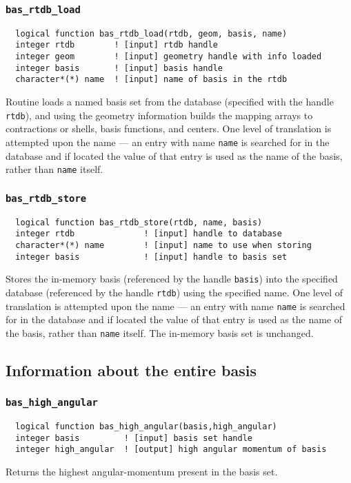 \subsubsection{{\tt bas\_rtdb\_load}}
\begin{verbatim}
  logical function bas_rtdb_load(rtdb, geom, basis, name)
  integer rtdb        ! [input] rtdb handle      
  integer geom        ! [input] geometry handle with info loaded
  integer basis       ! [input] basis handle
  character*(*) name  ! [input] name of basis in the rtdb
\end{verbatim}
Routine loads a named basis set from the database (specified with the
handle {\tt rtdb}), and using the geometry information builds the
mapping arrays to contractions or shells, basis functions, and
centers.  One level of translation is attempted upon the name --- an
entry with name {\tt name} is searched for in the database and if
located the value of that entry is used as the name of the basis,
rather than {\tt name} itself.

\subsubsection{{\tt bas\_rtdb\_store}}
\begin{verbatim}
  logical function bas_rtdb_store(rtdb, name, basis)
  integer rtdb              ! [input] handle to database
  character*(*) name        ! [input] name to use when storing
  integer basis             ! [input] handle to basis set
\end{verbatim}
Stores the in-memory basis (referenced by the handle {\tt basis}) into
the specified database (referenced by the handle {\tt rtdb}) using the
specified name.  One level of translation is attempted upon the name
--- an entry with name {\tt name} is searched for in the database and
if located the value of that entry is used as the name of the basis,
rather than {\tt name} itself.  The in-memory basis set is unchanged.

\subsection{Information about the entire basis}

\subsubsection{{\tt bas\_high\_angular}}
\begin{verbatim}
  logical function bas_high_angular(basis,high_angular)
  integer basis         ! [input] basis set handle
  integer high_angular  ! [output] high angular momentum of basis
\end{verbatim}
Returns the highest angular-momentum present in the basis set.

